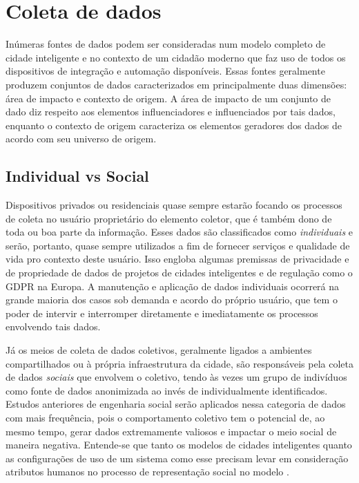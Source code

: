 \chapter{Coleta de dados}

Inúmeras fontes de dados podem ser consideradas num modelo completo de cidade inteligente e no contexto de um cidadão moderno que faz uso de todos os dispositivos de integração e automação disponíveis. Essas fontes geralmente produzem conjuntos de dados caracterizados em principalmente duas dimensões: área de impacto e contexto de origem. A área de impacto de um conjunto de dado diz respeito aos elementos influenciadores e influenciados por tais dados, enquanto o contexto de origem caracteriza os elementos geradores dos dados de acordo com seu universo de origem.

\section{Individual vs Social}

Dispositivos privados ou residenciais quase sempre estarão focando os processos de coleta no usuário proprietário do elemento coletor, que é também dono de toda ou boa parte da informação. Esses dados são classificados como \textit{individuais} e serão, portanto, quase sempre utilizados a fim de fornecer serviços e qualidade de vida pro contexto deste usuário. Isso engloba algumas premissas de privacidade e de propriedade de dados de projetos de cidades inteligentes e de regulação como o GDPR \cite{eu:gdpr} na Europa. A manutenção e aplicação de dados individuais ocorrerá na grande maioria dos casos sob demanda e acordo do próprio usuário, que tem o poder de intervir e interromper diretamente e imediatamente os processos envolvendo tais dados.

Já os meios de coleta de dados coletivos, geralmente ligados a ambientes compartilhados ou à própria infraestrutura da cidade, são responsáveis pela coleta de dados \textit{sociais} que envolvem o coletivo, tendo às vezes um grupo de indivíduos como fonte de dados anonimizada ao invés de individualmente identificados. Estudos anteriores de engenharia social serão aplicados nessa categoria de dados com mais frequência, pois o comportamento coletivo tem o potencial de, ao mesmo tempo, gerar dados extremamente valiosos e impactar o meio social de maneira negativa. Entende-se que tanto os modelos de cidades inteligentes quanto as configurações de uso de um sistema como esse precisam levar em consideração atributos humanos no processo de representação social no modelo \cite{huso17}.

